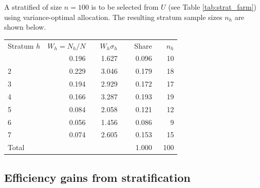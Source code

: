 \documentclass{my_eth_beamer}
\numberwithin{equation}{section}
\begin{document}
\begin{frame}
    \begin{Bsp}
        \label{ex:strat_county_opt}
        \vspace{-0.25em}
        A stratified \SRS of size $n=100$ is to be selected from $U$ (see
        Table \ref{tab:strat_farm}) using variance-optimal allocation. The
        resulting stratum sample sizes $n_h$ are shown below.
        \begin{center}
            {\small
            \begin{tabular}{lrrrr}
                \toprule
                \addlinespace
                Stratum $h$ &\;$W_h = N_h / N$ & $\quad W_h\sigma_{h}$ &
                $\quad$ Share& $\quad n_h$\\
                \addlinespace
                \midrule
                1 & 0.196 & 1.627 & 0.096 & 10\\
                2 & 0.229 & 3.046 & 0.179 & 18\\
                3 & 0.194 & 2.929 & 0.172 & 17\\
                4 & 0.166 & 3.287 & 0.193 & 19\\
                5 & 0.084 & 2.058 & 0.121 & 12\\
                6 & 0.056 & 1.456 & 0.086 & 9\\
                7 & 0.074 & 2.605 & 0.153 & 15\\
                \midrule
                \multicolumn{2}{l}{Total} & & 1.000 & 100\\
                \bottomrule
            \end{tabular}
        }
        \end{center}
    \end{Bsp}
\end{frame}

\subsection{Efficiency gains from stratification}\label{sec:strat_efficiency}
\end{document}
